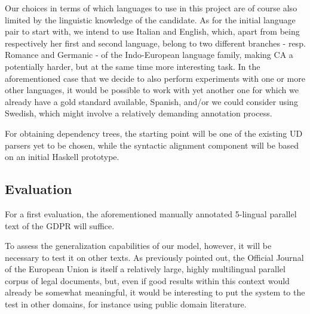 \documentclass{article}
\begin{document}
Our choices in terms of which languages to use in this project are of course also limited by the linguistic knowledge of the candidate.
As for the initial language pair to start with, we intend to use Italian and English, which, apart from being respectively her first and second language, belong to two different branches - resp. Romance and Germanic - of the Indo-European language family, making CA a potentially harder, but at the same time more interesting task. 
In the aforementioned case that we decide to also perform experiments with one or more other languages, it would be possible to work with yet another one for which we already have a gold standard available, Spanish, and/or we could consider using Swedish, which might involve a relatively demanding annotation process.

For obtaining dependency trees, the starting point will be one of the existing UD parsers yet to be chosen, while the syntactic alignment component will be based on an initial Haskell prototype.

\subsection{Evaluation}
For a first evaluation, the aforementioned manually annotated 5-lingual parallel text of the GDPR will suffice.

To assess the generalization capabilities of our model, however, it will be necessary to test it on other texts. As previously pointed out, the Official Journal of the European Union is itself a relatively large, highly multilingual parallel corpus of legal documents, but, even if good results within this context would already be somewhat meaningful, it would be interesting to put the system to the test in other domains, for instance using public domain literature.




\end{document}
